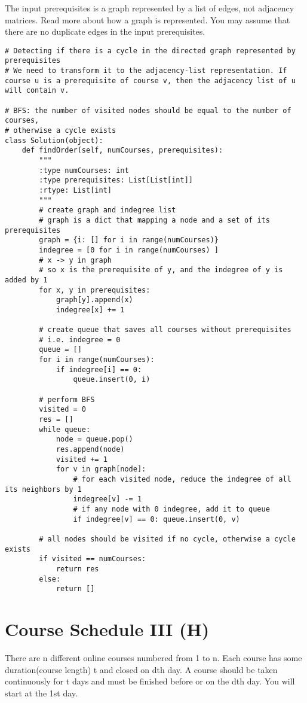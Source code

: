     The input prerequisites is a graph represented by a list of edges, not adjacency matrices. Read more about how a graph is represented.
    You may assume that there are no duplicate edges in the input prerequisites.
\begin{lstlisting}
# Detecting if there is a cycle in the directed graph represented by prerequisites
# We need to transform it to the adjacency-list representation. If course u is a prerequisite of course v, then the adjacency list of u will contain v.

# BFS: the number of visited nodes should be equal to the number of courses,
# otherwise a cycle exists
class Solution(object):
    def findOrder(self, numCourses, prerequisites):
        """
        :type numCourses: int
        :type prerequisites: List[List[int]]
        :rtype: List[int]
        """
        # create graph and indegree list
        # graph is a dict that mapping a node and a set of its prerequisites
        graph = {i: [] for i in range(numCourses)}
        indegree = [0 for i in range(numCourses) ]
        # x -> y in graph
        # so x is the prerequisite of y, and the indegree of y is added by 1
        for x, y in prerequisites:
            graph[y].append(x)
            indegree[x] += 1
        
        # create queue that saves all courses without prerequisites
        # i.e. indegree = 0
        queue = []
        for i in range(numCourses):
            if indegree[i] == 0:
                queue.insert(0, i)
        
        # perform BFS
        visited = 0 
        res = []
        while queue:
            node = queue.pop()
            res.append(node)
            visited += 1
            for v in graph[node]:
                # for each visited node, reduce the indegree of all its neighbors by 1
                indegree[v] -= 1
                # if any node with 0 indegree, add it to queue
                if indegree[v] == 0: queue.insert(0, v)
                    
        # all nodes should be visited if no cycle, otherwise a cycle exists
        if visited == numCourses:
            return res
        else:
            return []
\end{lstlisting}

\section{Course Schedule III (H)}
There are n different online courses numbered from 1 to n. Each course has some duration(course length) t and closed on dth day. A course should be taken continuously for t days and must be finished before or on the dth day. You will start at the 1st day.

